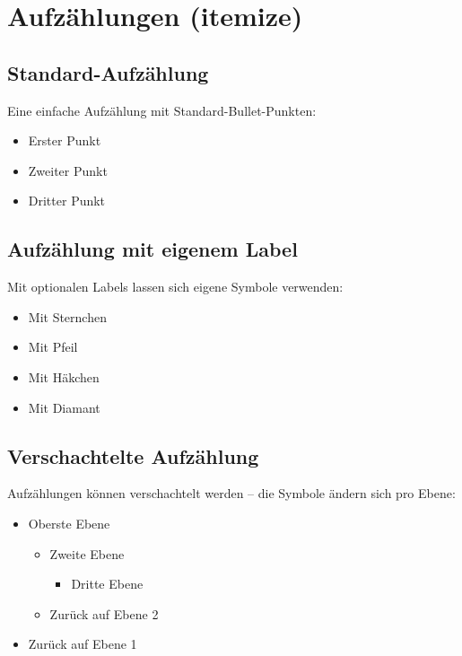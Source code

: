 
\chapter{Aufzählungen (itemize)}
\label{sec:itemize}

\section{Standard-Aufzählung}

Eine einfache Aufzählung mit Standard-Bullet-Punkten:

\begin{itemize}
    \item Erster Punkt
    \item Zweiter Punkt
    \item Dritter Punkt
\end{itemize}

\section{Aufzählung mit eigenem Label}

Mit optionalen Labels lassen sich eigene Symbole verwenden:

\begin{itemize}
    \item[$\star$] Mit Sternchen
    \item[$\rightarrow$] Mit Pfeil
    \item[$\checkmark$] Mit Häkchen
    \item[$\diamond$] Mit Diamant
\end{itemize}

\section{Verschachtelte Aufzählung}

Aufzählungen können verschachtelt werden -- die Symbole ändern sich pro Ebene:

\begin{itemize}
    \item Oberste Ebene
    \begin{itemize}
        \item Zweite Ebene
        \begin{itemize}
            \item Dritte Ebene
        \end{itemize}
        \item Zurück auf Ebene 2
    \end{itemize}
    \item Zurück auf Ebene 1
\end{itemize}

